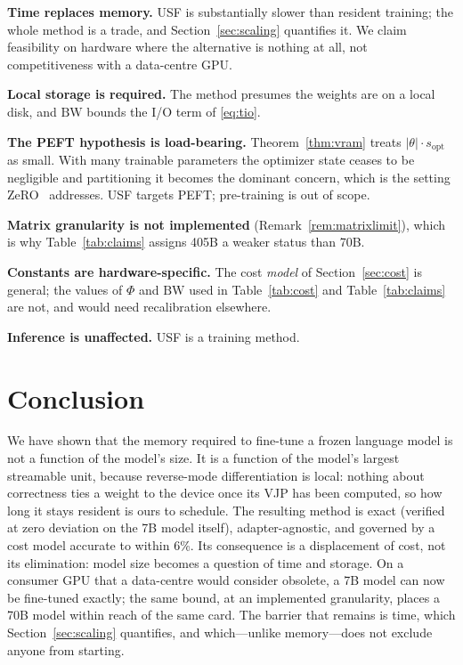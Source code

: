 \documentclass[preprint,12pt]{elsarticle}
\newcommand{\usf}{USF}
\begin{document}
\textbf{Time replaces memory.} \usf{} is substantially slower than resident training; the whole
method is a trade, and Section~\ref{sec:scaling} quantifies it. We claim feasibility on hardware where the
alternative is nothing at all, not competitiveness with a data-centre GPU.

\textbf{Local storage is required.} The method presumes the weights are on a local disk, and
$\mathrm{BW}$ bounds the I/O term of \eqref{eq:tio}.

\textbf{The PEFT hypothesis is load-bearing.} Theorem~\ref{thm:vram} treats $|\theta|\cdot s_{\text{opt}}$
as small. With many trainable parameters the optimizer state ceases to be negligible and
partitioning it becomes the dominant concern, which is the setting ZeRO~\cite{rajbhandari2020zero}
addresses. \usf{} targets PEFT; pre-training is out of scope.

\textbf{Matrix granularity is not implemented} (Remark~\ref{rem:matrixlimit}), which is why
Table~\ref{tab:claims} assigns 405B a weaker status than 70B.

\textbf{Constants are hardware-specific.} The cost \emph{model} of Section~\ref{sec:cost} is general; the
values of $\Phi$ and $\mathrm{BW}$ used in Table~\ref{tab:cost} and Table~\ref{tab:claims} are not, and would need
recalibration elsewhere.

\textbf{Inference is unaffected.} \usf{} is a training method.

\section{Conclusion}

We have shown that the memory required to fine-tune a frozen language model is not a function of
the model's size. It is a function of the model's largest streamable unit, because reverse-mode
differentiation is local: nothing about correctness ties a weight to the device once its VJP has
been computed, so how long it stays resident is ours to schedule. The resulting method is exact
(verified at zero deviation on the 7B model itself),
adapter-agnostic, and governed by a cost model accurate to within 6\%. Its consequence is a
displacement of cost, not its elimination: model size becomes a question of time and storage.
On a consumer GPU that a data-centre would consider obsolete, a 7B model can now be fine-tuned
exactly; the same bound, at an implemented granularity, places a 70B model within reach of the same
card. The barrier that remains is time, which Section~\ref{sec:scaling} quantifies, and which---unlike
memory---does not exclude anyone from starting.



\end{document}
